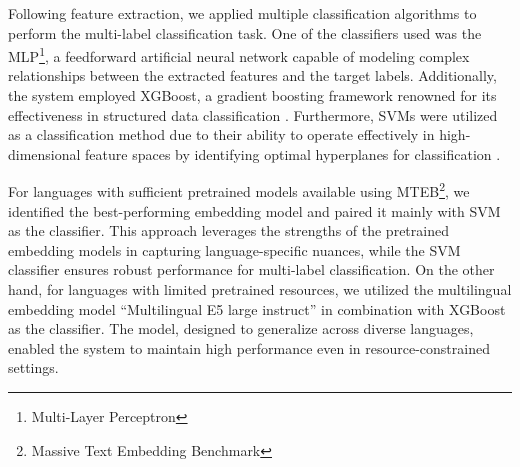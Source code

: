 Following feature extraction, we applied multiple classification algorithms to perform the multi-label classification task. One of the classifiers used was the MLP\footnote{Multi-Layer Perceptron}, a feedforward artificial neural network capable of modeling complex relationships between the extracted features and the target labels. Additionally, the system employed XGBoost, a gradient boosting framework renowned for its effectiveness in structured data classification \citep{chen2016xgboost}. Furthermore, SVMs were utilized as a classification method due to their ability to operate effectively in high-dimensional feature spaces by identifying optimal hyperplanes for classification \citep{cortes1995support}.

For languages with sufficient pretrained models available using MTEB\footnote{Massive Text Embedding Benchmark}\citep{muennighoff2022mteb}, we identified the best-performing embedding model and paired it mainly with SVM as the classifier. This approach leverages the strengths of the pretrained embedding models in capturing language-specific nuances, while the SVM classifier ensures robust performance for multi-label classification. On the other hand, for languages with limited pretrained resources, we utilized the multilingual embedding model ``Multilingual E5 large instruct'' \citep{wang2024multilingual} in combination with XGBoost as the classifier. The model, designed to generalize across diverse languages, enabled the system to maintain high performance even in resource-constrained settings.



